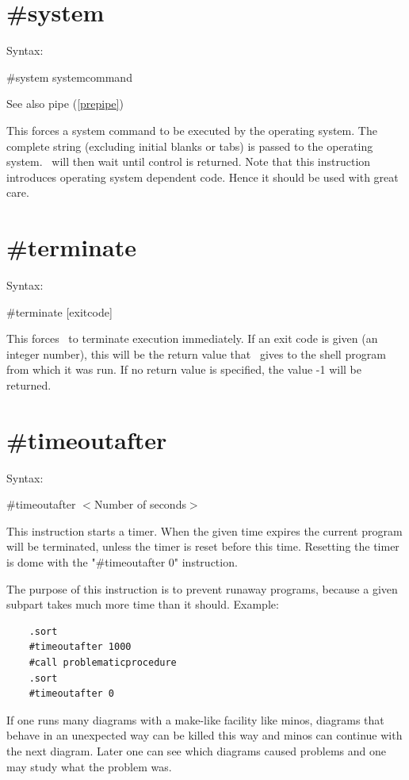  
\section{\#system}
\label{presystem}

\noindent Syntax:

\#system systemcommand
 
\noindent See also pipe (\ref{prepipe})

\noindent This forces a system command to be executed by 
the operating system. The complete string (excluding initial blanks or 
tabs) is passed to the operating system. \FORM\ will then wait until control 
is returned. Note that this instruction introduces operating system 
dependent code. Hence it should be used with great care.

 
\section{\#terminate}
\label{preterminate}

\noindent Syntax:

\#terminate [exitcode]
 
\noindent This forces \FORM\ to terminate execution 
immediately. If an exit code is given (an integer number), this will be the 
return value that \FORM\ gives to the shell program from which it was run. If 
no return value is specified, the value -1 will be returned.

 
\section{\#timeoutafter}
\label{pretimeoutafter}

\noindent Syntax:

\#timeoutafter $<$Number of seconds$>$
 
\noindent This instruction starts a timer. When the given time expires the 
current program will be terminated, unless the timer is reset before this 
time. Resetting the timer is dome with the "\#timeoutafter 0" instruction.

The purpose of this instruction is to prevent runaway programs, because a 
given subpart takes much more time than it should. Example:
\begin{verbatim}
    .sort
	#timeoutafter 1000
	#call problematicprocedure
	.sort
	#timeoutafter 0
\end{verbatim}
If one runs many diagrams with a make-like facility like minos, diagrams 
that behave in an unexpected way can be killed this way and minos can 
continue with the next diagram. Later one can see which diagrams caused 
problems and one may study what the problem was.

